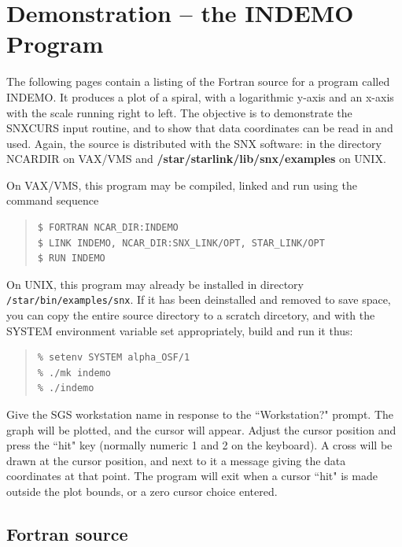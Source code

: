 \documentclass[twoside,11pt]{article}
\renewcommand{\_}{\texttt{\symbol{95}}}
\begin{document}
\section {Demonstration -- the INDEMO Program} \label{demo3_sect}

The following pages contain a listing of the Fortran source for a program
called INDEMO.
It produces a plot of a spiral, with a logarithmic y-axis and an x-axis with
the scale running right to left.
The objective is to demonstrate the SNX\_CURS input routine, and to show that
data coordinates can be read in and used.
Again, the source is distributed with the SNX software: in the directory
NCAR\_DIR on VAX/VMS and {\bf /star/\-starlink/\-lib/\-snx/examples} on UNIX.

On VAX/VMS, this program may be compiled, linked and run using the command
sequence

\begin {quote}
\begin{verbatim}
$ FORTRAN NCAR_DIR:INDEMO
$ LINK INDEMO, NCAR_DIR:SNX_LINK/OPT, STAR_LINK/OPT
$ RUN INDEMO
\end{verbatim}
\end {quote}

On UNIX, this program may already be installed in directory
{\tt /star/bin/examples/snx}.  If it has been deinstalled and removed to save
space, you can copy the entire source directory to a scratch dircetory, and
with the SYSTEM environment variable set appropriately, build and run it thus:

\begin {quote}
\begin{verbatim}
% setenv SYSTEM alpha_OSF/1
% ./mk indemo
% ./indemo
\end{verbatim}
\end {quote}

Give the SGS workstation name in response to the ``Workstation?" prompt.
The graph will be plotted, and the cursor will appear.
Adjust the cursor position and press the ``hit" key (normally numeric 1 and 2
on the keyboard).
A cross will be drawn at the cursor position, and next
to it a message giving the data coordinates at that point.
The program will exit when a cursor ``hit" is made outside the plot bounds,
or a zero cursor choice entered.


\subsection {Fortran source}
\end{document}
